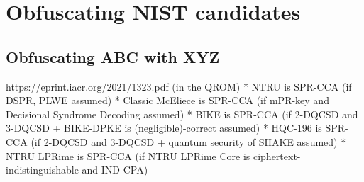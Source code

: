 \chapter{Obfuscating NIST candidates}\label{ch:results}

\section{Obfuscating ABC with XYZ} \label{sec:tbd}

https://eprint.iacr.org/2021/1323.pdf (in the QROM)
* NTRU is SPR-CCA (if DSPR, PLWE assumed)
* Classic McEliece is SPR-CCA (if mPR-key and Decisional Syndrome Decoding assumed)
* BIKE is SPR-CCA (if 2-DQCSD and 3-DQCSD + BIKE-DPKE is (negligible)-correct assumed) 
* HQC-196 is SPR-CCA (if 2-DQCSD and 3-DQCSD + quantum security of SHAKE assumed) 
* NTRU LPRime is SPR-CCA (if NTRU LPRime Core is ciphertext-indistinguishable and IND-CPA)